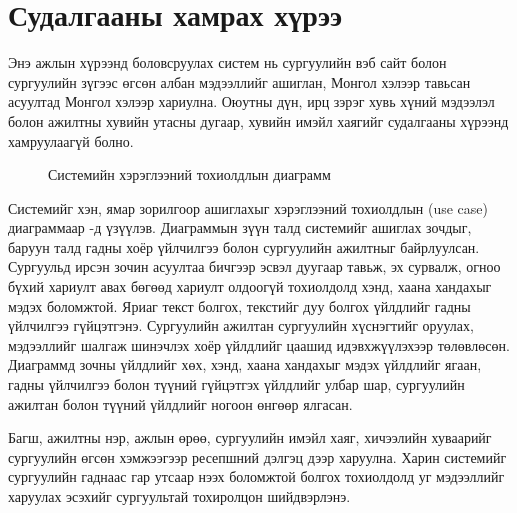 
\section{Судалгааны хамрах хүрээ}
\label{sec:intro-scope}

Энэ ажлын хүрээнд боловсруулах систем нь сургуулийн вэб сайт болон сургуулийн зүгээс өгсөн албан мэдээллийг ашиглан, Монгол хэлээр тавьсан асуултад Монгол хэлээр хариулна. Оюутны дүн, ирц зэрэг хувь хүний мэдээлэл болон ажилтны хувийн утасны дугаар, хувийн имэйл хаягийг судалгааны хүрээнд хамруулаагүй болно.

\begin{figure}[ht]
\centering
{}
\caption{Системийн хэрэглээний тохиолдлын диаграмм}
\label{fig:usecase}
\end{figure}

Системийг хэн, ямар зорилгоор ашиглахыг хэрэглээний тохиолдлын (use case) диаграммаар -д үзүүлэв. Диаграммын зүүн талд системийг ашиглах зочдыг, баруун талд гадны хоёр үйлчилгээ болон сургуулийн ажилтныг байрлуулсан. Сургуульд ирсэн зочин асуултаа бичгээр эсвэл дуугаар тавьж, эх сурвалж, огноо бүхий хариулт авах бөгөөд хариулт олдоогүй тохиолдолд хэнд, хаана хандахыг мэдэх боломжтой. Яриаг текст болгох, текстийг дуу болгох үйлдлийг гадны үйлчилгээ гүйцэтгэнэ. Сургуулийн ажилтан сургуулийн хүснэгтийг оруулах, мэдээллийг шалгаж шинэчлэх хоёр үйлдлийг цаашид идэвхжүүлэхээр төлөвлөсөн. Диаграммд зочны үйлдлийг хөх, хэнд, хаана хандахыг мэдэх үйлдлийг ягаан, гадны үйлчилгээ болон түүний гүйцэтгэх үйлдлийг улбар шар, сургуулийн ажилтан болон түүний үйлдлийг ногоон өнгөөр ялгасан.

Багш, ажилтны нэр, ажлын өрөө, сургуулийн имэйл хаяг, хичээлийн хуваарийг сургуулийн өгсөн хэмжээгээр ресепшний дэлгэц дээр харуулна. Харин системийг сургуулийн гаднаас гар утсаар нээх боломжтой болгох тохиолдолд уг мэдээллийг харуулах эсэхийг сургуультай тохиролцон шийдвэрлэнэ.

